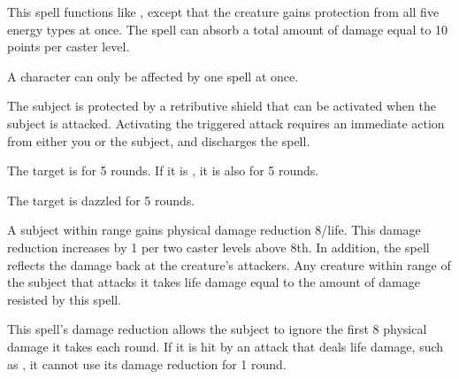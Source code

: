 \begin{spelleffect}
    This spell functions like , except that the creature gains protection from all five energy types at once. The spell can absorb a total amount of damage equal to 10 points per caster level.
\end{spelleffect}
\begin{spellnotes}
    A character can only be affected by one  spell at once.
\end{spellnotes}

\begin{spelleffect}
    The subject is protected by a retributive shield that can be activated when the subject is attacked. Activating the triggered attack requires an immediate action from either you or the subject, and discharges the spell.
\end{spelleffect}
\begin{spellsuccess}
    The target is \dazzled for 5 rounds. If it is \bloodied, it is also \blinded for 5 rounds.
\end{spellsuccess}
\begin{spellfailure}
    The target is dazzled for 5 rounds.
\end{spellfailure}

\spelldur{\durshort}
\begin{spelleffect}
    A subject within \rngclose range gains physical damage reduction 8/life. This damage reduction increases by 1 per two caster levels above 8th. In addition, the spell reflects the damage back at the creature's attackers. Any creature within \rngmed range of the subject that attacks it takes life damage equal to the amount of damage resisted by this spell.
\end{spelleffect}
\begin{spellnotes}
    This spell's damage reduction allows the subject to ignore the first 8 physical damage it takes each round. If it is hit by an attack that deals life damage, such as , it cannot use its damage reduction for 1 round.
\end{spellnotes}

